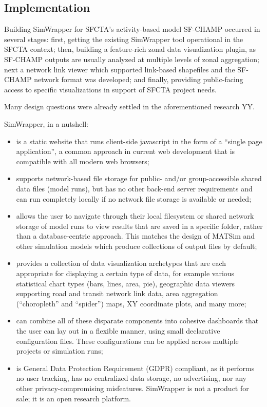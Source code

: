 \documentclass[3p,times,procedia]{elsarticle}
\begin{document}
\subsection{Implementation}

Building SimWrapper for SFCTA’s activity-based model SF-CHAMP occurred in several stages: first, getting the existing SimWrapper tool operational in the SFCTA context; then, building a feature-rich zonal data visualization plugin, as SF-CHAMP outputs are usually analyzed at multiple levels of zonal aggregation; next a network link viewer which supported link-based shapefiles and the SF-CHAMP network format was developed; and finally, providing public-facing access to specific visualizations in support of SFCTA project needs.

Many design questions were already settled in the aforementioned research YY.

SimWrapper, in a nutshell:

\begin{itemize}[]
\item
    is a static website that runs client-side javascript in the form of a ``single page application'', a common approach in current web
    development that is compatible with all modern web browsers;
\item
    supports network-based file storage for public- and/or
    group-accessible shared data files (model runs), but has no other
    back-end server requirements and can run completely locally if no
    network file storage is available or needed;
\item
    allows the user to navigate through their local filesystem or shared
    network storage of model runs to view results that are saved in a
    specific folder, rather than a database-centric approach. This
    matches the design of MATSim and other simulation models which
    produce collections of output files by default;
\item
    provides a collection of data visualization archetypes that are each
    appropriate for displaying a certain type of data, for example
    various statistical chart types (bars, lines, area, pie), geographic
    data viewers supporting road and transit network link data, area
    aggregation (``choropleth'' and ``spider'') maps, XY coordinate
    plots, and many more;
\item
    can combine all of these disparate components into cohesive
    dashboards that the user can lay out in a flexible manner, using
    small declarative configuration files. These configurations can be
    applied across multiple projects or simulation runs;
\item
    is General Data Protection Requirement (GDPR) compliant, as it performs no user tracking, has no centralized data storage, no advertising, nor any other privacy-compromising misfeatures. SimWrapper is not a product for sale; it is an open research platform.
\end{itemize}
\end{document}
